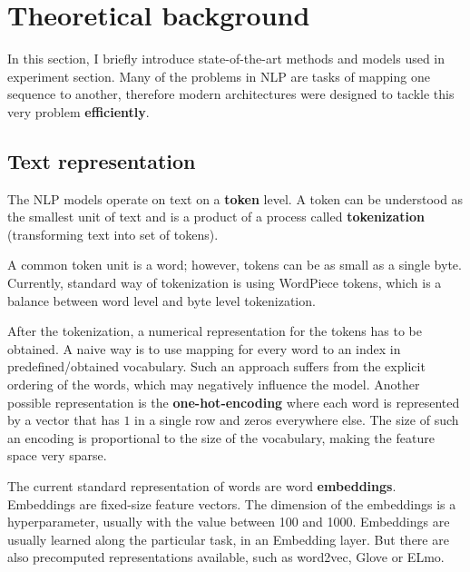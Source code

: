 \chapter{Theoretical background}\label{theory}
In this section, I briefly introduce state-of-the-art methods and models used in experiment section. Many of the problems in NLP are tasks of mapping one sequence to another, therefore modern architectures were designed to tackle this very problem \textbf{efficiently}.




\section{Text representation}
The NLP models operate on text on a \textbf{token} level. A token can be understood as the smallest unit of text and is a product of a process called \textbf{tokenization} (transforming text into set of tokens).

A common token unit is a word; however, tokens can be as small as a single byte. Currently, standard way of tokenization is using WordPiece tokens, which is a balance between word level and byte level tokenization.

After the tokenization, a numerical representation for the tokens has to be obtained. A naive way is to use mapping for every word to an index in predefined/obtained vocabulary. Such an approach suffers from the explicit ordering of the words, which may negatively influence the model. Another possible representation is the \textbf{one-hot-encoding} where each word is represented by a vector that has $1$ in a single row and zeros everywhere else. The size of such an encoding is proportional to the size of the vocabulary, making the feature space very sparse. 

The current standard representation of words are word \textbf{embeddings}. Embeddings are fixed-size feature vectors. The dimension of the embeddings is a hyperparameter, usually with the value between 100 and 1000. Embeddings are usually learned along the particular task, in an Embedding layer. But there are also precomputed representations available, such as word2vec, Glove or ELmo.
\newpage





